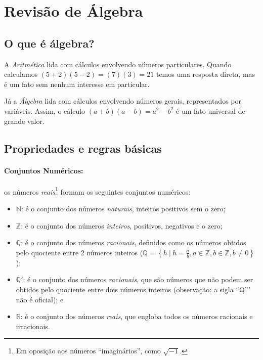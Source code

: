 \documentclass[pdftex, brazil, 12pt, twoside]{article}
\begin{document}
\section{Revisão de Álgebra}
\label{revisao-algebra}

\subsection{O que é álgebra?}
\label{revisao-algebra-o-que-e}

A \emph{Aritmética} lida com cálculos envolvendo números particulares. Quando calculamos
$(5+2)(5-2) = (7)(3) = 21$ temos uma resposta direta, mas é um fato sem nenhum interesse
em particular.

Já a \emph{Álgebra} lida com cálculos envolvendo números gerais, representados
por variáveis. Assim, o cálculo $(a+b)(a-b) = a^2 - b^2$ é um fato universal de grande
valor.

\subsection{Propriedades e regras básicas}
\label{revisao-algebra-regras-basicas}

\paragraph{Conjuntos Numéricos:} os números \emph{reais}\footnote{Em oposição aos números ``imaginários'', como
  $\sqrt{-1}$.} formam os seguintes conjuntos numéricos:

\begin{itemize}
\item $\mathbb{N}$: é o conjunto dos números \emph{naturais}, inteiros positivos sem o zero;
\item $\mathbb{Z}$: é o conjunto dos números \emph{inteiros}, positivos, negativos e o zero;
\item $\mathbb{Q}$: é o conjunto dos números \emph{racionais}, definidos como os números obtidos
  pelo quociente entre 2 números inteiros ($\mathbb{Q} = \left\{h\ |\ h = \frac{a}{b}, a \in \mathbb{Z}, b \in \mathbb{Z}, b \ne 0\right\}$);
\item $\mathbb{Q'}$: é o conjunto dos números \emph{racionais}, que são números que não podem
  ser obtidos pelo quociente entre dois números inteiros (observação: a sigla ``Q''' não é oficial); e
\item $\mathbb{R}$: é o conjunto dos números \emph{reais}, que engloba todos os números racionais
  e irracionais.
\end{itemize}
\end{document}
